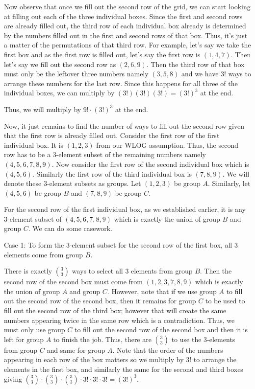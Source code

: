 \begin{enumerate}
 Now observe that once we fill out the second row of the grid, we can start looking at filling out each of the three individual boxes. Since the first and second rows are already filled out, the third row of each individual box already is determined by the numbers filled out in the first and second rows of that box. Thus, it's just a matter of the permutations of that third row. For example, let's say we take the first box and as the first row is filled out, let's say the first row is $(1, 4, 7)$. Then let's say we fill out the second row as $(2, 6, 9)$. Then the third row of that box must only be the leftover three numbers namely $(3, 5, 8)$ and we have $3!$ ways to arrange these numbers for the last row. Since this happens for all three of the individual boxes, we can multiply by $(3!)(3!)(3!) = (3!)^3$ at the end.

 Thus, we will multiply by $9! \cdot (3!)^3$ at the end. 

 Now, it just remains to find the number of ways to fill out the second row given that the first row is already filled out. Consider the first row of the first individual box. It is $(1, 2, 3)$ from our WLOG assumption. Thus, the second row has to be a $3$-element subset of the remaining numbers namely $(4, 5, 6, 7, 8, 9)$. Now consider the first row of the second individual box which is $(4, 5, 6)$. Similarly the first row of the third individual box is $(7, 8, 9)$. We will denote these $3$-element subsets as groups. Let $(1, 2, 3)$ be group $A$. Similarly, let $(4, 5, 6)$ be group $B$ and $(7, 8, 9)$ be group $C$. 

 For the second row of the first individual box, as we established earlier, it is any $3$-element subset of $(4, 5, 6, 7, 8, 9)$ which is exactly the union of group $B$ and group $C$. We can do some casework.

 Case 1: To form the $3$-element subset for the second row of the first box, all $3$ elements come from group $B$.

 There is exactly $\binom{3}{3}$ ways to select all $3$ elements from group $B$. Then the second row of the second box must come from $(1, 2, 3, 7, 8, 9)$ which is exactly the union of group $A$ and group $C$. However, note that if we use group $A$ to fill out the second row of the second box, then it remains for group $C$ to be used to fill out the second row of the third box; however that will create the same numbers appearing twice in the same row which is a contradiction. Thus, we must only use group $C$ to fill out the second row of the second box and then it is left for group $A$ to finish the job. Thus, there are $\binom{3}{3}$ to use the $3$-elements from group $C$ and same for group $A$. Note that the order of the numbers appearing in each row of the box matters so we multiply by $3!$ to arrange the elements in the first box, and similarly the same for the second and third boxes giving $\binom{3}{3} \cdot \binom{3}{3} \cdot \binom{3}{3} \cdot 3! \cdot 3! \cdot 3! = (3!)^3$.


\end{enumerate}
